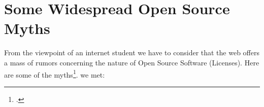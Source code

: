 %
%
%
%

%




\section{Some Widespread Open Source Myths}

From the viewpoint of an internet student we have to consider that the web
offers a mass of rumors concerning the nature of Open Source Software
(Licenses). Here are some of the myths\footcite[At least one time even a
scientific legally discussing book is talking about the \glqq{}Myth around Open
Source Licenses\grqq{} - although only as part of  the title: cf][1ff,
especially 209ff]{GuiOvd2006a}.
we met:
 

